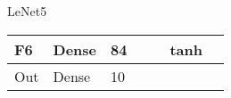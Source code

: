 \documentclass[10pt, table, dvipsnames,xcdraw, handout]{beamer}
\begin{document}
\begin{frame}[fragile]{LeNet5}
\begin{minipage}[t][0.6\textheight][t]{\textwidth}
\begin{table}[]
\begin{tabular}{|l|l|l|l|l|l|l|}
F6                           & Dense                       & 84                                                                       &                               &                               & tanh                              &                             \\ \hline
Out                          & Dense                       & 10                                                                       &                               &                               &                                   &                             \\ \hline
\end{tabular}
\end{table}

\end{minipage}
\end{frame}
\end{document}
